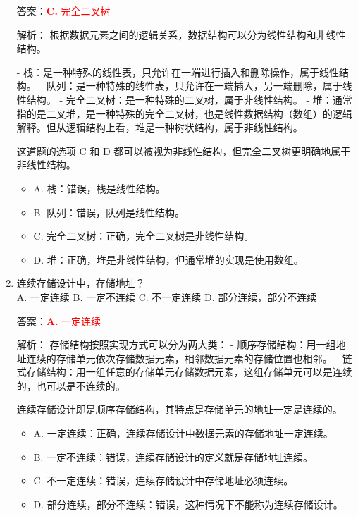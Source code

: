 \documentclass[lang=cn,newtx,10pt,scheme=chinese]{../../../elegantbook}
\begin{document}
\begin{enumerate}
    答案：\textcolor{red}{\textbf{C.} 完全二叉树}

    解析：
    根据数据元素之间的逻辑关系，数据结构可以分为线性结构和非线性结构。
    
    - 栈：是一种特殊的线性表，只允许在一端进行插入和删除操作，属于线性结构。
    - 队列：是一种特殊的线性表，只允许在一端插入，另一端删除，属于线性结构。
    - 完全二叉树：是一种特殊的二叉树，属于非线性结构。
    - 堆：通常指的是二叉堆，是一种特殊的完全二叉树，也是线性数据结构（数组）的逻辑解释。但从逻辑结构上看，堆是一种树状结构，属于非线性结构。

    这道题的选项 C 和 D 都可以被视为非线性结构，但完全二叉树更明确地属于非线性结构。

    \begin{itemize}
        \item A. 栈：错误，栈是线性结构。
        \item B. 队列：错误，队列是线性结构。
        \item C. 完全二叉树：正确，完全二叉树是非线性结构。
        \item D. 堆：正确，堆是非线性结构，但通常堆的实现是使用数组。
    \end{itemize}

    \item 连续存储设计中，存储地址？\\
    A. 一定连续 \quad B. 一定不连续 \quad C. 不一定连续 \quad D. 部分连续，部分不连续

    答案：\textcolor{red}{\textbf{A.} 一定连续}

    解析：
    存储结构按照实现方式可以分为两大类：
    - 顺序存储结构：用一组地址连续的存储单元依次存储数据元素，相邻数据元素的存储位置也相邻。
    - 链式存储结构：用一组任意的存储单元存储数据元素，这组存储单元可以是连续的，也可以是不连续的。
    
    连续存储设计即是顺序存储结构，其特点是存储单元的地址一定是连续的。

    \begin{itemize}
        \item A. 一定连续：正确，连续存储设计中数据元素的存储地址一定连续。
        \item B. 一定不连续：错误，连续存储设计的定义就是存储地址连续。
        \item C. 不一定连续：错误，连续存储设计中存储地址必须连续。
        \item D. 部分连续，部分不连续：错误，这种情况下不能称为连续存储设计。
    \end{itemize}


\end{enumerate}
\end{document}
